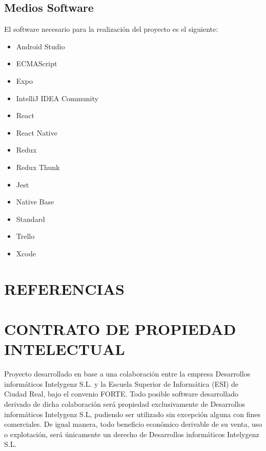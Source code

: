 \documentclass{pre-tfg}
\begin{document}
    \subsection{Medios Software}

    El software necesario para la realización del proyecto es el siguiente:
    \begin{itemize}
        \item Android Studio~\cite{ASTUDIO}
        \item ECMAScript~\cite{ECMA}
        \item Expo~\cite{Expo}
        \item IntelliJ IDEA Community~\cite{IDEA}
        \item React~\cite{REACT}
        \item React Native~\cite{RENA}
        \item Redux~\cite{REDUX}
        \item Redux Thunk~\cite{THUNK}
        \item Jest~\cite{JEST}
        \item Native Base~\cite{NABA}
        \item Standard~\cite{STAND}
        \item Trello~\cite{TRELLO}
        \item Xcode~\cite{XCODE}
    \end{itemize}


    \section{REFERENCIAS}

    
    \singlespacing
    

    \section{CONTRATO DE PROPIEDAD INTELECTUAL}

    Proyecto desarrollado en base a una colaboración entre la empresa Desarrollos informáticos Intelygenz S.L. y
    la Escuela Superior de Informática (ESI) de Ciudad Real, bajo el convenio FORTE. Todo posible software desarrollado
    derivado de dicha colaboración será propiedad exclusivamente de Desarrollos informáticos Intelygenz S.L, pudiendo ser
    utilizado sin excepción alguna con fines comerciales. De igual manera, todo beneficio económico derivable de su venta,
    uso o explotación, será únicamente un derecho de Desarrollos informáticos Intelygenz S.L.
\end{document}
